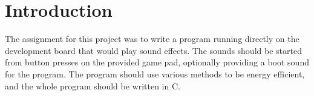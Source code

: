\section{Introduction}
The assignment for this project was to write a program running directly on the development board that would play sound effects.
The sounds should be started from button presses on the provided game pad, optionally providing a boot sound for the program.
The program should use various methods to be energy efficient, and the whole program should be written in C.
